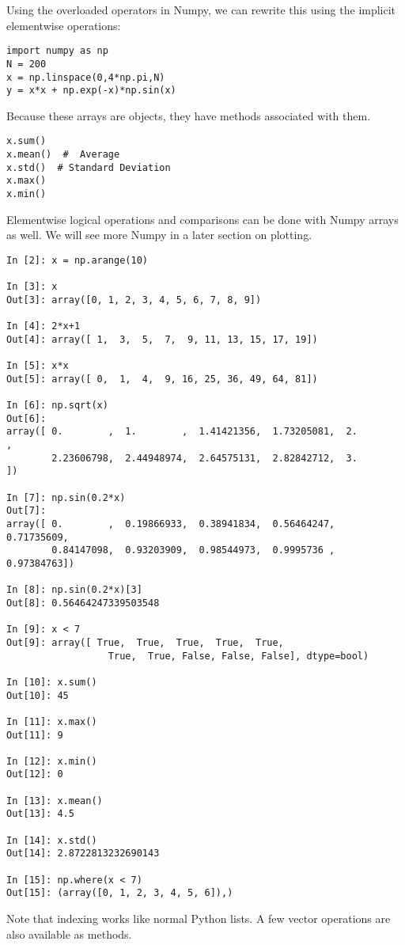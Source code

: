 Using the overloaded operators in Numpy, we can rewrite this using the
implicit elementwise operations:

\begin{verbatim}
import numpy as np
N = 200
x = np.linspace(0,4*np.pi,N)
y = x*x + np.exp(-x)*np.sin(x)
\end{verbatim}

Because these arrays are objects, they have methods associated with
them.

\begin{verbatim}
x.sum()
x.mean()  #  Average
x.std()  # Standard Deviation
x.max()
x.min()
\end{verbatim}

Elementwise logical operations and comparisons can be done with Numpy
arrays as well. We will see more Numpy in a later section on plotting.

\begin{verbatim}
In [2]: x = np.arange(10)

In [3]: x
Out[3]: array([0, 1, 2, 3, 4, 5, 6, 7, 8, 9])

In [4]: 2*x+1
Out[4]: array([ 1,  3,  5,  7,  9, 11, 13, 15, 17, 19])

In [5]: x*x
Out[5]: array([ 0,  1,  4,  9, 16, 25, 36, 49, 64, 81])

In [6]: np.sqrt(x)
Out[6]:
array([ 0.        ,  1.        ,  1.41421356,  1.73205081,  2.        ,
        2.23606798,  2.44948974,  2.64575131,  2.82842712,  3.        ])

In [7]: np.sin(0.2*x)
Out[7]:
array([ 0.        ,  0.19866933,  0.38941834,  0.56464247,  0.71735609,
        0.84147098,  0.93203909,  0.98544973,  0.9995736 ,  0.97384763])

In [8]: np.sin(0.2*x)[3]
Out[8]: 0.56464247339503548

In [9]: x < 7
Out[9]: array([ True,  True,  True,  True,  True,
                  True,  True, False, False, False], dtype=bool)

In [10]: x.sum()
Out[10]: 45

In [11]: x.max()
Out[11]: 9

In [12]: x.min()
Out[12]: 0

In [13]: x.mean()
Out[13]: 4.5

In [14]: x.std()
Out[14]: 2.8722813232690143

In [15]: np.where(x < 7)
Out[15]: (array([0, 1, 2, 3, 4, 5, 6]),)
\end{verbatim}

Note that indexing works like normal Python lists. A few vector
operations are also available as methods.


